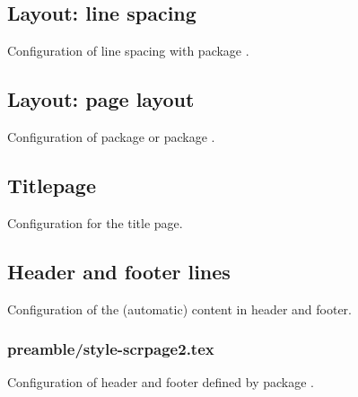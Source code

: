 
\subsection{Layout: line spacing}

Configuration of line spacing with package .


\subsection{Layout: page layout}

Configuration of package  or package .


\subsection{Titlepage}

Configuration for the title page.


\subsection{Header and footer lines}

Configuration of the (automatic) content in header and footer.


\subsubsection{preamble/style-scrpage2.tex}

Configuration of header and footer defined by package . 


